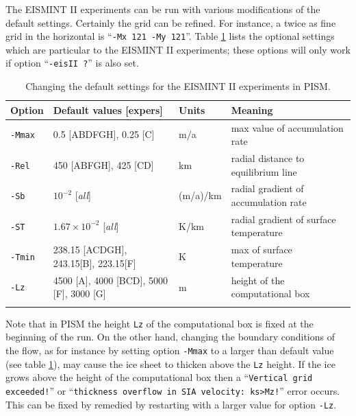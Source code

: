 \documentclass[11pt,final]{amsart}
\renewcommand{\t}[1]{\texttt{#1}}
\begin{document}
The EISMINT II experiments can be run with various modifications of the default settings.  Certainly the grid can be refined.  For instance, a twice as fine grid in the horizontal is ``\t{-Mx 121 -My 121}''.  Table \ref{tab:eisIIoptions} lists the optional settings which are particular to the EISMINT II experiments; these options will only work if option ``\t{-eisII ?}'' is also set.

\begin{table}[h]
\caption{Changing the default settings for the EISMINT II experiments in PISM.}\label{tab:eisIIoptions}
\small
\begin{tabular}{@{}llll}\hline
\textbf{Option} & \textbf{Default values [expers]} & \textbf{Units} & \textbf{Meaning} \\ \hline
\verb|-Mmax| & 0.5 [ABDFGH], 0.25 [C] & m$/$a & max value of accumulation rate \\
\verb|-Rel| & 450 [ABFGH], 425 [CD] & km & radial distance to equilibrium line \\
\verb|-Sb| & $10^{-2}$ [\emph{all}] & (m/a)/km & radial gradient of accumulation rate \\
\verb|-ST| & $1.67 \times 10^{-2}$ [\emph{all}] & K/km & radial gradient of surface temperature\\
\verb|-Tmin| & 238.15 [ACDGH], 243.15[B], 223.15[F] & K & max of surface temperature \\ \hline
\verb|-Lz| & 4500 [A], 4000 [BCD], 5000 [F], 3000 [G] & m & height of the computational box \\
\hline\normalsize
\end{tabular}\end{table}

Note that in PISM the height \verb|Lz| of the computational box is fixed at the beginning of the run.  On the other hand, changing the boundary conditions of the flow, as for instance by setting option \verb|-Mmax| to a larger than default value (see table \ref{tab:eisIIoptions}), may cause the ice sheet to thicken above the \verb|Lz| height.  If the ice grows above the height of the computational box then a ``\verb|Vertical grid exceeded!|'' or ``\verb|thickness overflow in SIA velocity: ks>Mz!|'' error occurs.  This can be fixed by remedied by restarting with a larger value for option \verb|-Lz|.
\end{document}
